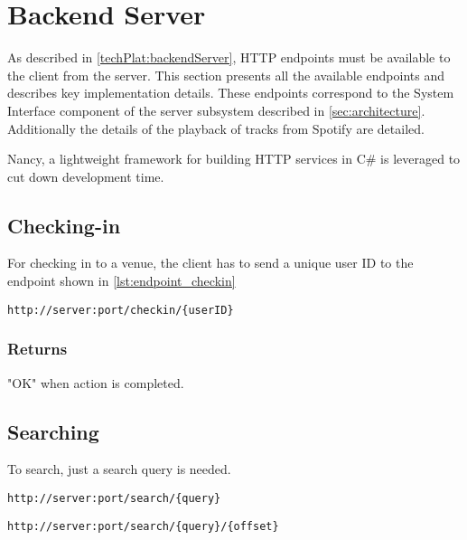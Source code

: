 \section{Backend Server}
\label{imp:backendServer}

As described in \cref{techPlat:backendServer}, HTTP endpoints must be
available to the client from the server. This section presents all the
available endpoints and describes key implementation
details. These endpoints correspond to the System Interface component of the
server subsystem described in \cref{sec:architecture}. Additionally the details of the playback of tracks from
Spotify are detailed.

Nancy, a lightweight framework for building HTTP services in C\# is leveraged
to cut down development time.

\subsection{Checking-in}
For checking in to a venue, the client has to send a unique user ID to
the endpoint shown in \cref{lst:endpoint_checkin}

\begin{lstlisting}[label={lst:endpoint_checkin}, caption={HTTP endpoint allowing client to check-in to a venue. Text surrounded by curly brackets are parameters.}]
http://server:port/checkin/{userID}
\end{lstlisting}

\subsubsection{Returns}
"OK" when action is completed.

\subsection{Searching}
To search, just a search query is needed.

\begin{lstlisting}[label={lst:endpoint_search}, caption={Text surrounded by curly brackets are parameters.}]
http://server:port/search/{query}
\end{lstlisting}

\begin{lstlisting}[label={lst:endpoint_search_offset}, caption={Text surrounded by curly brackets are parameters.}]
http://server:port/search/{query}/{offset}
\end{lstlisting}


